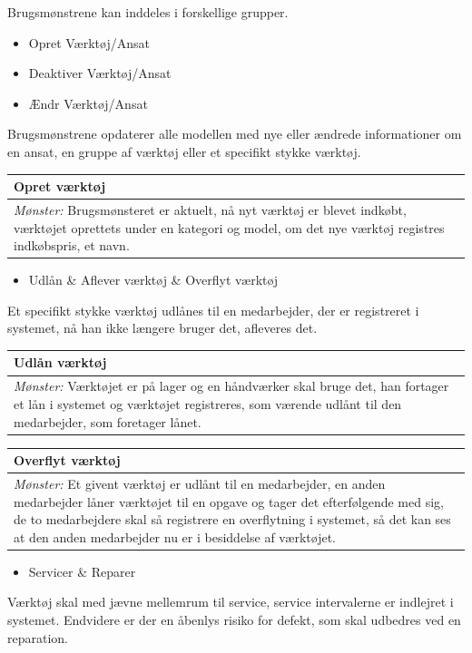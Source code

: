\documentclass{article}
\begin{document}
Brugsmønstrene kan inddeles i forskellige grupper.
\begin{itemize}
\item Opret Værktøj/Ansat
\item Deaktiver Værktøj/Ansat
\item Ændr Værktøj/Ansat
\end{itemize} 
Brugsmønstrene opdaterer alle modellen med nye eller ændrede informationer om en ansat, en gruppe af værktøj eller et specifikt stykke værktøj.

\begin{tabular}{p{10cm}}
\hline
\centerline{Opret værktøj}\\
\hline
\emph{Mønster:} Brugsmønsteret er aktuelt, nå nyt værktøj er blevet indkøbt, værktøjet oprettets under en kategori og model, om det nye værktøj registres indkøbspris, et navn.\\ 
\hline
\end{tabular}


\begin{itemize}
\item Udlån \& Aflever værktøj \& Overflyt værktøj
\end{itemize} 
Et specifikt stykke værktøj udlånes til en medarbejder, der er registreret i systemet, nå han ikke længere bruger det, afleveres det. 


\begin{tabular}{p{10cm}}
\hline
\centerline{Udlån værktøj}\\
\hline
\emph{Mønster:} Værktøjet er på lager og en håndværker skal bruge det, han fortager et lån i systemet og værktøjet registreres, som værende udlånt til den medarbejder, som foretager lånet.\\
\hline
\end{tabular}


\begin{tabular}{p{10cm}}
\hline
\centerline{Overflyt værktøj}\\
\hline
\emph{Mønster:} Et givent værktøj er udlånt til en medarbejder, en anden medarbejder låner værktøjet til en opgave og tager det efterfølgende med sig, de to medarbejdere skal så registrere en overflytning i systemet, så det kan ses at den anden medarbejder nu er i besiddelse af værktøjet.\\
\hline  
\end{tabular}


\begin{itemize}
\item Servicer \& Reparer
\end{itemize} 
Værktøj skal med jævne mellemrum til service, service intervalerne er indlejret i systemet. Endvidere er der en åbenlys risiko for defekt, som skal udbedres ved en reparation. 
\end{document}
